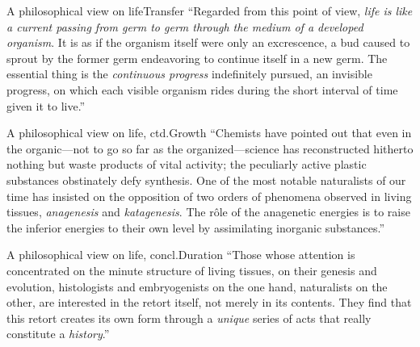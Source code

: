\begin{frame}{A philosophical view on life}{Transfer}
{\small ``Regarded from this point of view, \emph{life is like a current passing from germ to germ through the medium of a developed organism}. It is as if the organism itself were only an excrescence, a bud caused to sprout by the former germ endeavoring to continue itself in a new germ. The essential thing is the \emph{continuous progress} indefinitely pursued, an invisible progress, on which each visible organism rides during the short interval of time given it to live.''} \qquad\qquad {}
\end{frame}

\begin{frame}{A philosophical view on life, ctd.}{Growth}
``Chemists have pointed out that even in the organic---not to go so far as the organized---science has reconstructed hitherto nothing but waste products of vital activity; the peculiarly active plastic substances obstinately defy synthesis.  One of the most notable naturalists of our time has insisted on the opposition of two orders of phenomena observed in living tissues, \emph{anagenesis} and \emph{katagenesis}. The r\^{o}le of the anagenetic energies is to raise the inferior energies to their own level by assimilating inorganic substances.''\quad {}
\end{frame}

\begin{frame}{A philosophical view on life, concl.}{Duration}
``Those whose attention is concentrated on the minute structure of living tissues, on their genesis and evolution, histologists and embryogenists on the one hand, naturalists on the other, are interested in the retort itself, not merely in its contents. They find that this retort creates its own form through a \emph{unique} series of acts that really constitute a \emph{history}.''\quad {}
\end{frame}

